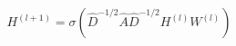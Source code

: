 \documentclass[preview]{standalone}
\begin{document}
\begin{align*}
H^{(l+1)} = \sigma(\hat{D}^{-1/2}\hat{A}\hat{D}^{-1/2}H^{(l)}W^{(l)})
\end{align*}
\end{document}
